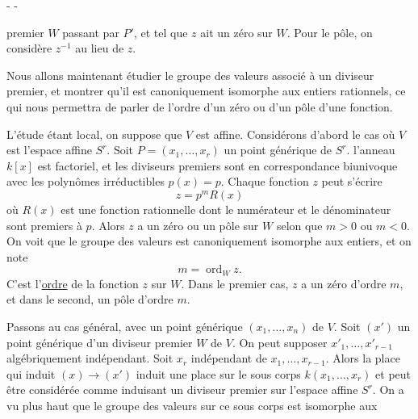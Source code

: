-  -

premier $W$ passant par $P'$, et tel que $z$ ait un zéro sur $W$. Pour le pôle, on considère $z^{-1}$ au lieu de $z$.

Nous allons maintenant étudier le groupe des valeurs associé à un diviseur premier, et montrer qu'il est canoniquement isomorphe aux entiers rationnels, ce qui nous permettra de parler de l'ordre d'un zéro ou d'un pôle d'une fonction.

L'étude étant local, on suppose que $V$ est affine. Considérons d'abord le cas où $V$ est l'espace affine $S^r$. Soit $P=(x_1,\ldots,x_r)$ un point générique de $S^r$. l'anneau $k[x]$ est factoriel, et les diviseurs premiers sont en correspondance biunivoque avec les polynômes irréductibles $p(x)=p$. Chaque fonction $z$ peut s'écrire
\[
z=p^mR(x)
\]
où $R(x)$ est une fonction rationnelle dont le numérateur et le dénominateur sont premiers à $p$. Alors $z$ a un zéro ou un pôle sur $W$ selon que $m>0$ ou $m<0$. On voit que le groupe des valeurs est canoniquement isomorphe aux entiers, et on note
\[
m=\operatorname{ord}_W z.
\]
C'est l'\uline{ordre} de la fonction $z$ sur $W$. Dans le premier cas, $z$ a un zéro d'ordre $m$, et dans le second, un pôle d'ordre $m$.

Passons au cas général, avec un point générique $(x_1,\ldots,x_n)$ de $V$. Soit $(x')$ un point générique d'un diviseur premier $W$ de $V$. On peut supposer $x'_1,\ldots,x'_{r-1}$ algébriquement indépendant. Soit $x_r$ indépendant de $x_1,\ldots,x_{r-1}$. Alors la place qui induit $(x)\longrightarrow(x')$ induit une place sur le sous corps $k(x_1,\ldots,x_r)$ et peut être considérée comme induisant un diviseur premier sur l'espace affine $S^r$. On a vu plus haut que le groupe des valeurs sur ce sous corps est isomorphe aux
